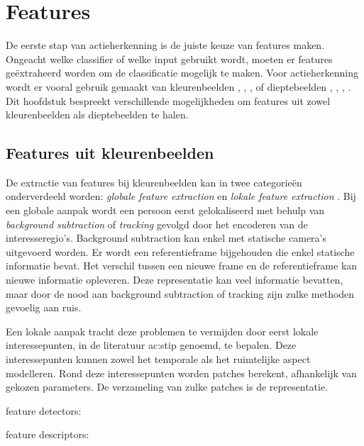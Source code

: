 %

\chapter{Features}
De eerste stap van actieherkenning is de juiste keuze van features maken. Ongeacht welke classifier of welke input gebruikt wordt, moeten er features geëxtraheerd worden om de classificatie mogelijk te maken. Voor actieherkenning wordt er vooral gebruik gemaakt van kleurenbeelden \cite{Laptev2008}, \cite{Dollar2005}, \cite{Willems2008}, \cite{Wang2011} of dieptebeelden \cite{Li2010}, \cite{Wang2012a}, \cite{Xia2012}, \cite{Gu2010}. Dit hoofdstuk bespreekt verschillende mogelijkheden om features uit zowel kleurenbeelden als dieptebeelden te halen. 

\section{Features uit kleurenbeelden}
De extractie van features bij kleurenbeelden kan in twee categorieën onderverdeeld worden: \textit{globale feature extraction} en \textit{lokale feature extraction} \cite{Poppe2010}. Bij een globale aanpak wordt een persoon eerst gelokaliseerd met behulp van \textit{background subtraction} of \textit{tracking} gevolgd door het encoderen van de interesseregio's. Background subtraction kan enkel met statische camera's uitgevoerd worden. Er wordt een referentieframe bijgehouden die enkel statische informatie bevat. Het verschil tussen een nieuwe frame en de referentieframe kan nieuwe informatie opleveren. Deze representatie kan veel informatie bevatten, maar door de nood aan background subtraction of tracking zijn zulke methoden gevoelig aan ruis.

Een lokale aanpak tracht deze problemen te vermijden door eerst lokale interessepunten, in de literatuur \gls{ac:stip} genoemd, te bepalen. Deze interessepunten kunnen zowel het temporale als het ruimtelijke aspect modelleren. Rond deze interessepunten worden patches berekent, afhankelijk van gekozen parameters. De verzameling van zulke patches is de representatie. 
 
feature detectors:

feature descriptors:
 
